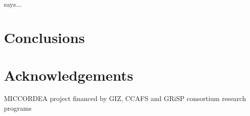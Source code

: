 \documentclass[preprint,12pt]{elsarticle}
\begin{document}
\citet{Thornton2009} says...

\section{Conclusions}

\section{Acknowledgements}
MICCORDEA project financed by GIZ, CCAFS and GRiSP consortium research programs















\end{document}
